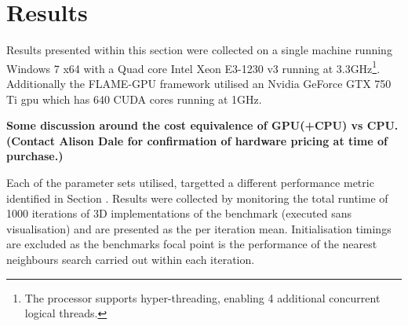 \section{Results\label{sec:results}}
  Results presented within this section were collected on a single machine running Windows 7 x64 with a Quad core Intel Xeon E3-1230 v3 running at 3.3GHz\footnote{The processor supports hyper-threading, enabling 4 additional concurrent logical threads.}. Additionally the FLAME-GPU framework utilised an Nvidia GeForce GTX 750 Ti \gls{gpu} which has 640 CUDA cores running at 1GHz.
  
  \textbf{Some discussion around the cost equivalence of GPU(+CPU) vs CPU. (Contact Alison Dale for confirmation of hardware pricing at time of purchase.)}
  
  Each of the parameter sets utilised, targetted a different performance metric identified in Section \label{sec:effective-usage}. Results were collected by monitoring the total runtime of 1000 iterations of 3D implementations of the benchmark (executed sans visualisation) and are presented as the per iteration mean. Initialisation timings are excluded as the benchmarks focal point is the performance of the nearest neighbours search carried out within each iteration.
